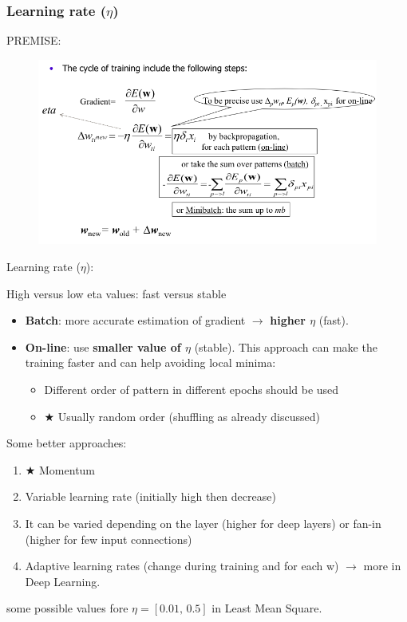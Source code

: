 \documentclass[../main.tex]{subfiles}
\begin{document}
\subsubsection{Learning rate ($\eta$)}
PREMISE:
\begin{figure}[H]
    \centering
    \includegraphics[scale = 0.45]{lectures/4_neural_networks/4_learning_rate_premise.png}
\end{figure}

\noindent Learning rate ($\eta$):
\begin{center}
High versus low eta values: fast versus stable
\end{center}
\begin{itemize}
    \item \textbf{Batch}: more accurate estimation of gradient $\rightarrow$ \textbf{higher $\eta$} (fast).
    \item \textbf{On-line}: use \textbf{smaller value of $\eta$} (stable). This approach can make the training faster and can help avoiding local minima:
    \begin{itemize}
        \item Different order of pattern in different epochs should be used
        \item $\bigstar$ Usually random order (shuffling as already discussed)
    \end{itemize}
\end{itemize}

Some better approaches:
\begin{enumerate}
    \item $\bigstar$ Momentum
    \item Variable learning rate (initially high then decrease)
    \item It can be varied depending on the layer (higher for deep layers) or fan-in (higher for few input connections)
    \item Adaptive learning rates (change during training and for each w) $\rightarrow$ more in Deep Learning.
\end{enumerate}
some possible values fore $\eta = [0.01,\, 0.5]$ in Least Mean Square.\\
\end{document}
